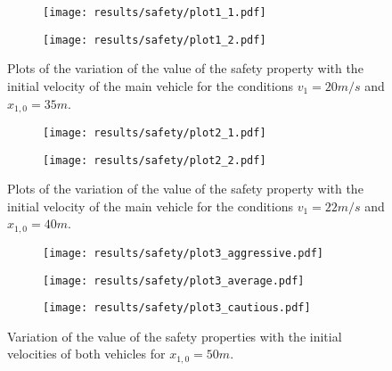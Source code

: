 \begin{figure}[H]
\centering
\begin{subfigure}{0.75\textwidth}
  \centering
  \texttt{[image: results/safety/plot1\_1.pdf]}
\end{subfigure}
\begin{subfigure}{0.75\textwidth}
  \centering
  \texttt{[image: results/safety/plot1\_2.pdf]}
\end{subfigure} 
\caption{Plots of the variation of the value of the safety property with the initial velocity of the main vehicle for the conditions $v_1 = 20m/s$ and $x_{1,0} = 35m$.}
\label{fig:plot1}
\end{figure}

\begin{figure}[H]
\centering
\begin{subfigure}{0.75\textwidth}
  \centering
  \texttt{[image: results/safety/plot2\_1.pdf]}
\end{subfigure}
\begin{subfigure}{0.75\textwidth}
  \centering
  \texttt{[image: results/safety/plot2\_2.pdf]}
\end{subfigure} 
\caption{Plots of the variation of the value of the safety property with the initial velocity of the main vehicle for the conditions $v_1 = 22m/s$ and $x_{1,0} = 40m$.}
\label{fig:plot2}
\end{figure}

\begin{figure}[H]
\centering
\begin{subfigure}{0.5\textwidth}
  \centering
  \texttt{[image: results/safety/plot3\_aggressive.pdf]}
\end{subfigure}
\begin{subfigure}{0.5\textwidth}
  \centering
  \texttt{[image: results/safety/plot3\_average.pdf]}
\end{subfigure} 
\begin{subfigure}{0.5\textwidth}
  \centering
  \texttt{[image: results/safety/plot3\_cautious.pdf]}
\end{subfigure} 
\caption{Variation of the value of the safety properties with the initial velocities of both vehicles for $x_{1,0} = 50m$.}
\label{fig:plot3}
\end{figure}

